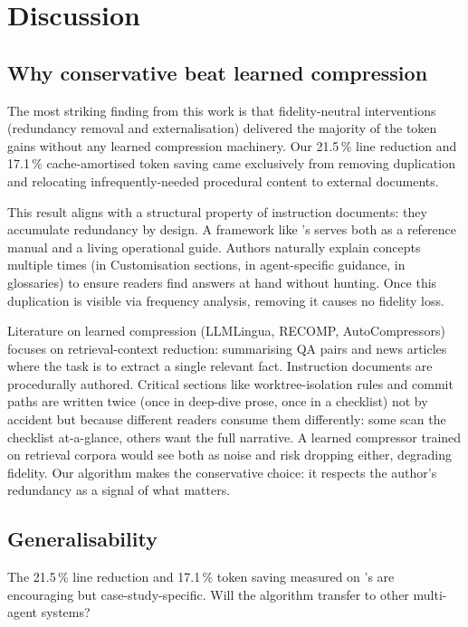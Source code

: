 \section{Discussion}
\label{sec:discussion}

\subsection{Why conservative beat learned compression}

The most striking finding from this work is that fidelity-neutral interventions
(redundancy removal and externalisation) delivered the majority of the token
gains without any learned compression machinery. Our 21.5\,\% line reduction
and 17.1\,\% cache-amortised token saving came exclusively from removing
duplication and relocating infrequently-needed procedural content to external
documents.

This result aligns with a structural property of instruction documents: they
accumulate redundancy by design. A framework like \blackrim's \claudemd serves
both as a reference manual and a living operational guide. Authors naturally
explain concepts multiple times (in Customisation sections, in agent-specific
guidance, in glossaries) to ensure readers find answers at hand without
hunting. Once this duplication is visible via frequency analysis, removing it
causes no fidelity loss.

Literature on learned compression (LLMLingua, RECOMP, AutoCompressors) focuses
on retrieval-context reduction: summarising QA pairs and news articles where
the task is to extract a single relevant fact. Instruction documents are
procedurally authored. Critical sections like worktree-isolation rules and
commit paths are written twice (once in deep-dive prose, once in a checklist)
not by accident but because different readers consume them differently: some
scan the checklist at-a-glance, others want the full narrative. A learned
compressor trained on retrieval corpora would see both as noise and risk dropping
either, degrading fidelity. Our algorithm makes the conservative choice: it
respects the author's redundancy as a signal of what matters.

\subsection{Generalisability}

The 21.5\,\% line reduction and 17.1\,\% token saving measured on
\blackrim's \claudemd are encouraging but case-study-specific. Will the
algorithm transfer to other multi-agent systems?

